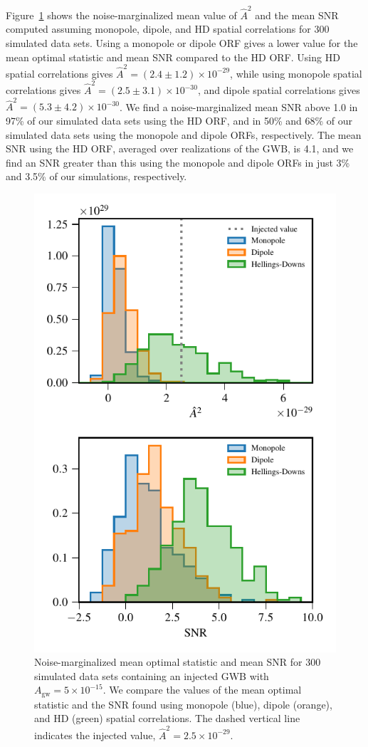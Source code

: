 \documentclass[twocolumn,aps,prd,superscriptaddress]{revtex4-1}
\newcommand{\Agw}{\ensuremath{A_\mathrm{gw}}}
\begin{document}
Figure~\ref{fig:os_ORF} shows the noise-marginalized 
mean value of $\hat{A}^2$ and the mean SNR 
computed assuming monopole, dipole, and HD spatial correlations 
for 300 simulated data sets. Using a monopole or dipole ORF 
gives a lower value for the mean optimal statistic and mean SNR compared to the 
HD ORF. 
Using HD spatial correlations gives $\hat{A}^2 = (2.4 \pm 1.2) \times 10^{-29}$, 
while using monopole spatial correlations gives $\hat{A}^2 = (2.5 \pm 3.1) \times 10^{-30}$, 
and dipole spatial correlations gives $\hat{A}^2 = (5.3 \pm 4.2) \times 10^{-30}$. 
We find a noise-marginalized mean SNR above 1.0 in 97\% of our simulated data sets 
using the HD ORF, and in 50\% and 68\% of our simulated data sets 
using the monopole and dipole ORFs, respectively. 
The mean SNR using the HD ORF, averaged over realizations of the GWB, is 4.1, 
and we find an SNR greater than this using the monopole and dipole ORFs in just 
3\% and 3.5\% of our simulations, respectively.
\begin{figure}[t]
	\includegraphics[width=0.9\columnwidth]{plots/optstat_spatial_A5e-15.pdf}
	\caption{Noise-marginalized mean optimal statistic and mean SNR for 300 simulated data sets 
			containing an injected GWB with $\Agw = 5\times10^{-15}$. 
			We compare the values of the mean optimal statistic and the SNR found 
			using monopole (blue), dipole (orange), and HD (green) spatial correlations. 
			The dashed vertical line indicates the injected value, $\hat{A}^2 = 2.5 \times 10^{-29}$.}
	\label{fig:os_ORF}
\end{figure}
\end{document}
